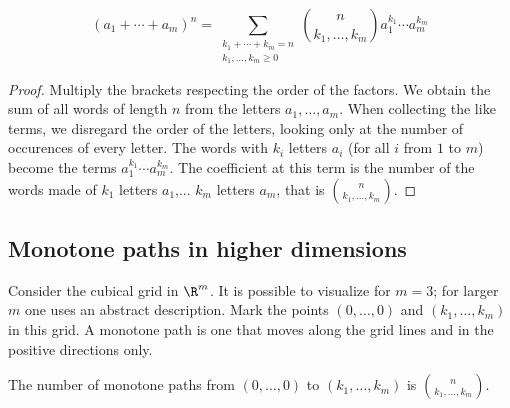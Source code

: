 \begin{page}
\setcounter{section}{4}
\setcounter{subsection}{2}
\setcounter{dfn}{2}
\label{portion:139}

\begin{thm}
\[
(a_1 + \cdots + a_m)^n = \sum_{\substack{k_1 + \cdots + k_m = n\\ k_1, \ldots, k_m \ge 0}}
\binom{n}{k_1, \ldots, k_m} a_1^{k_1} \cdots a_m^{k_m}
\]
\end{thm}

\end{page}

\begin{page}
\setcounter{section}{4}
\setcounter{subsection}{3}
\setcounter{dfn}{2}
\label{portion:140}

\begin{proof}
Multiply the brackets respecting the order of the factors.
We obtain the sum of all words of length $n$ from the letters $a_1, \ldots, a_m$.
When collecting the like terms, we disregard the order of the letters, looking only at the number of occurences of every letter.
The words with $k_i$ letters $a_i$ (for all $i$ from $1$ to $m$) become the terms $a_1^{k_1} \cdots a_m^{k_m}$.
The coefficient at this term is the number of the words made of $k_1$ letters $a_1$,... $k_m$ letters $a_m$,
that is $\binom{n}{k_1, \ldots, k_m}$.
\end{proof}



\end{page}

\begin{page}
\setcounter{section}{4}
\setcounter{subsection}{3}
\setcounter{dfn}{2}
\label{portion:142}

\subsection{Monotone paths in higher dimensions}
Consider the cubical grid in $\R^m$.
It is possible to visualize for $m=3$; for larger $m$ one uses an abstract description.
Mark the points $(0, \ldots, 0)$ and $(k_1, \ldots, k_m)$ in this grid.
A monotone path is one that moves along the grid lines and in the positive directions only.


\end{page}

\begin{page}
\setcounter{section}{4}
\setcounter{subsection}{3}
\setcounter{dfn}{3}
\label{portion:144}

\begin{thm}
The number of monotone paths from $(0, \ldots, 0)$ to $(k_1, \ldots, k_m)$ is $\binom{n}{k_1, \ldots, k_m}$.
\end{thm}

\end{page}

